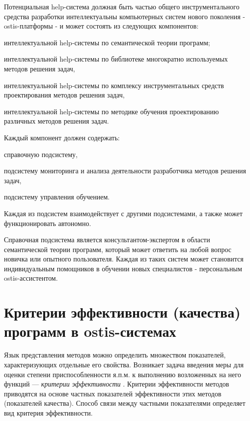 Потенциальная help-система должная быть частью общего инструментального средства разработки интеллектуальны компьютерных систем нового поколения - ostis-платформы \cite{Platform2021} - и может состоять из следующих компонентов:
\begin{textitemize}
	\item интеллектуальной help-системы по семантической теории программ;
	\item интеллектуальной help-системы по библиотеке многократно используемых методов решения задач,
	\item интеллектуальной help-системы по комплексу инструментальных средств проектирования  методов решения задач,
	\item интеллектуальной help-системы по методике обучения проектированию различных методов решения задач.
\end{textitemize}

Каждый компонент должен содержать:
\begin{textitemize}
	\item справочную подсистему,
	\item подсистему мониторинга и анализа деятельности разработчика методов решения задач,
	\item подсистему управления обучением.
\end{textitemize}

Каждая из подсистем взаимодействует с другими подсистемами, а также может функционировать автономно.

Справочная подсистема является консультантом-экспертом в области семантической теории программ, который может ответить на любой вопрос новичка или опытного пользователя. Каждая из таких систем может становится индивидуальным помощников в обучении новых специалистов - персональным ostis-ассистентом.

\section{Критерии эффективности (качества) программ в ostis-системах}
\label{sec_programs_method_kriteria}

Язык представления методов можно определить множеством показателей, характеризующих отдельные его свойства. Возникает задача введения меры для оценки степени приспособленности я.п.м. к выполнению возложенных на него функций — \textit{критерии эффективности} \cite{Orlov2013}. Критерии эффективности методов приводятся на основе частных показателей эффективности этих методов (показателей качества). Способ связи между частными показателями определяет вид критерия эффективности.

